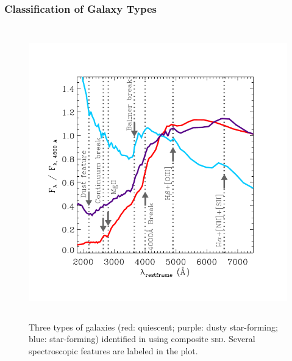 \documentclass{ar-1col}
\begin{document}
\subsubsection{Classification of Galaxy Types}


\begin{figure}
    \includegraphics[width=5in, height=5in]{images/spectral_features.pdf}
    \caption{Three types of galaxies (red: quiescent; purple: dusty star-forming; blue: star-forming) identified in \citet{Kriek2011} using composite \textsc{sed}. Several spectroscopic features are labeled in the plot.}
    \label{fig:kreiksed}
\end{figure}
\end{document}
